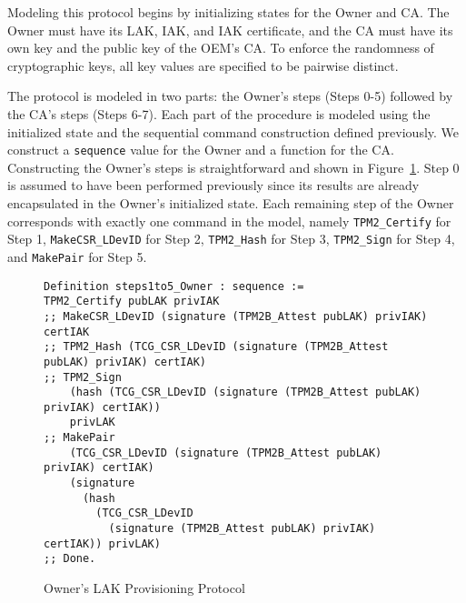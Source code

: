 \documentclass[runningheads]{llncs}
\begin{document}
Modeling this protocol begins by initializing states for the Owner and
CA. The Owner must have its LAK, IAK, and IAK certificate, and the CA
must have its own key and the public key of the OEM's CA.  
To enforce the randomness of cryptographic
keys, all key values are specified to be pairwise distinct.




The protocol is modeled in two parts: the Owner's steps (Steps 0-5)
followed by the CA's steps (Steps 6-7).  Each part of the procedure is
modeled using the initialized state and the sequential command
construction defined previously.  We construct a \verb|sequence| value
for the Owner and a function for the CA. Constructing the Owner's
steps is straightforward and shown in
Figure~\ref{fig:lak_model_Owner}. Step 0 is assumed to have been
performed previously since its results are already encapsulated in the
Owner's initialized state.  Each remaining step of the Owner
corresponds with exactly one command in the model, namely
\verb|TPM2_Certify| for Step 1, \verb|MakeCSR_LDevID| for Step 2,
\verb|TPM2_Hash| for Step 3, \verb|TPM2_Sign| for Step 4, and
\verb|MakePair| for Step 5.

\begin{figure}[hpbt]
\begin{lstlisting}[language=Coq]
Definition steps1to5_Owner : sequence :=
TPM2_Certify pubLAK privIAK
;; MakeCSR_LDevID (signature (TPM2B_Attest pubLAK) privIAK) certIAK
;; TPM2_Hash (TCG_CSR_LDevID (signature (TPM2B_Attest pubLAK) privIAK) certIAK)
;; TPM2_Sign 
    (hash (TCG_CSR_LDevID (signature (TPM2B_Attest pubLAK) privIAK) certIAK))
    privLAK
;; MakePair 
    (TCG_CSR_LDevID (signature (TPM2B_Attest pubLAK) privIAK) certIAK) 
    (signature
      (hash
        (TCG_CSR_LDevID
          (signature (TPM2B_Attest pubLAK) privIAK) certIAK)) privLAK)
;; Done. 
\end{lstlisting}
\caption{Owner's LAK Provisioning Protocol}
\label{fig:lak_model_Owner}
\end{figure}
\end{document}
